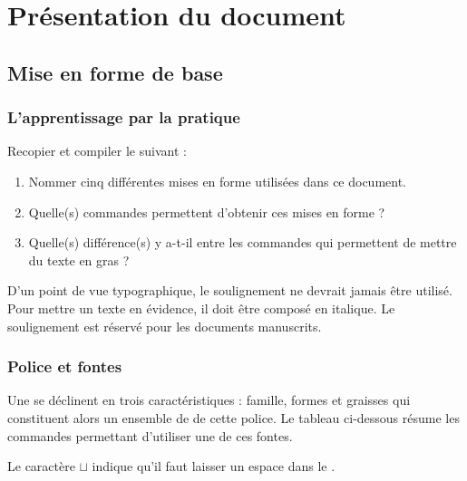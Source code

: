\renewcommand\MaCouleur{Cerulean}
\chapter{Présentation du document}
\thispagestyle{empty}

\section{Mise en forme de base}

\subsection{L'apprentissage par la pratique}

Recopier et compiler le  suivant :


\begin{enumerate}
    \item Nommer cinq différentes mises en forme utilisées dans ce document.
    \item Quelle(s) commandes permettent d'obtenir ces mises en forme ?
    \item Quelle(s) différence(s) y a-t-il entre les commandes qui permettent de mettre du texte en gras ?
\end{enumerate}

\begin{info}
    D'un point de vue typographique, le soulignement ne devrait jamais être utilisé. Pour mettre un texte en évidence, il doit être composé en italique. Le soulignement est réservé pour les documents manuscrits.
\end{info}

\subsection{Police et fontes}

Une  se déclinent en trois caractéristiques : famille, formes et graisses qui constituent alors un ensemble de  de cette police. Le tableau ci-dessous résume les commandes permettant d'utiliser une de ces fontes.

\begin{info}
	Le caractère $\sqcup$ indique qu'il faut laisser un espace dans le .
\end{info}


